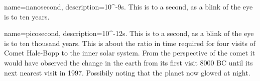 {   
    name=nanosecond,
    description={10^{-9}s. This is to a second, as a blink of the eye is to ten years.}
}

{
    name=picosecond,
    description={10^{-12}s. This is to a second, as a blink of the eye is to ten thousand years.
                 This is about the ratio in time required for four visits of 
                 Comet Hale-Bopp to the inner solar system. From the perspective of
                 the comet it would have observed the change in the earth from 
                 its first visit 8000 BC until its next nearest visit in 1997.
                 Possibily noting that the planet now glowed at night.}
}

